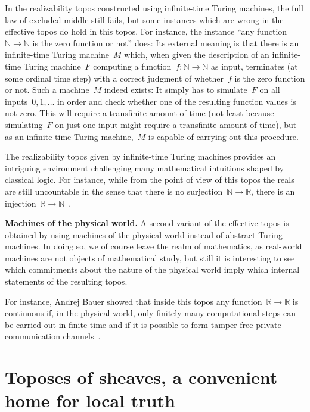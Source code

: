 \documentclass[oneside,reqno]{amsart}
\theoremstyle{definition}
\theoremstyle{plain}
\theoremstyle{remark}
\newcommand{\NN}{\mathbb{N}}
\newcommand{\RR}{\mathbb{R}}
\renewcommand{\_}{\mathpunct{.}\,}
\newcommand{\effective}{ef{}fective\xspace}
\newcommand{\?}{\,{:}\,}
\renewcommand{\paragraph}[1]{\noindent\textbf{#1.}}
\begin{document}
In the realizability topos constructed using infinite-time Turing machines, the full
law of excluded middle still fails, but some instances which are wrong in the
\effective topos do hold in this topos. For instance, the instance ``any
function~$\NN \to \NN$ is the zero function or not'' does: Its external meaning
is that there is an infinite-time Turing machine~$M$ which, when given the
description of an infinite-time Turing machine~$F$ computing a function~$f :
\NN \to \NN$ as input, terminates (at some ordinal time step) with a correct
judgment of whether~$f$ is the zero function or not. Such a machine~$M$ indeed
exists: It simply has to simulate~$F$ on all inputs~$0,1,\ldots$ in order and
check whether one of the resulting function values is not zero. This
will require a transfinite amount of time (not least because simulating~$F$ on
just one input might require a transfinite amount of time), but as an
infinite-time Turing machine,~$M$ is capable of carrying out this procedure.

The realizability topos given by infinite-time Turing machines provides an intriguing environment challenging many
mathematical intuitions shaped by classical logic. For instance, while from the
point of view of this topos the reals are still uncountable in the sense that
there is no surjection~$\NN \to \RR$, there is an injection~$\RR \to
\NN$~\cite{bauer:injection}.

\bigskip
\paragraph{Machines of the physical world} A second variant of the
\effective topos is obtained by using machines of the physical world
instead of abstract Turing machines. In doing so, we of
course leave the realm of mathematics, as real-world machines are not objects
of mathematical study, but still it is interesting to see which commitments
about the nature of the physical world imply which internal statements of the
resulting topos.

For instance, Andrej Bauer showed that inside this topos any function~$\RR \to
\RR$ is continuous if, in the physical world, only finitely many computational
steps can be carried out in finite time and if it is possible to form
tamper-free private communication channels~\cite{bauer:int-mathematics}.


\section{Toposes of sheaves, a convenient home for local truth}
\label{sect:sheaf-toposes}
\end{document}
